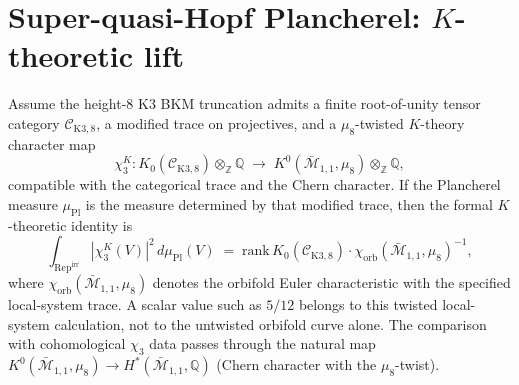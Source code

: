 \section{Super-quasi-Hopf Plancherel: $K$-theoretic lift}
\label{sec:super-quasi-hopf-K-theoretic}

\begin{theorem}
\label{thm:super-quasi-hopf-plancherel-K-theoretic}
%
%
Assume the height-$8$ K3 BKM truncation admits a finite
root-of-unity tensor category
$\mathcal C_{\mathrm{K3},8}$, a modified trace on projectives, and a
$\mu_8$-twisted $K$-theory character map
\begin{equation}\label{eq:super-qh-K-plancherel}
 \chi_3^K\colon
 K_0(\mathcal C_{\mathrm{K3},8})
 \otimes_{\mathbb Z}\mathbb Q\;
 \longrightarrow\;
 K^0(\bar{\mathcal M}_{1,1}, \mu_8)\otimes_{\mathbb Z}\mathbb Q,
\end{equation}
compatible with the categorical trace and the Chern character. If the
Plancherel measure $\mu_{\mathrm{Pl}}$ is the measure determined by
that modified trace, then the formal $K$-theoretic identity is
\begin{equation}\label{eq:super-qh-plancherel-identity}
 \int_{\mathrm{Rep}^{\mathrm{irr}}}
 |\chi_3^K(V)|^2\,d\mu_{\mathrm{Pl}}(V)
 \;=\;
 \mathrm{rank}\,K_0(\mathcal C_{\mathrm{K3},8})
 \cdot \chi_{\mathrm{orb}}(\bar{\mathcal M}_{1,1}, \mu_8)^{-1},
\end{equation}
where $\chi_{\mathrm{orb}}(\bar{\mathcal M}_{1,1},\mu_8)$ denotes the
orbifold Euler characteristic with the specified local-system trace.
A scalar value such as $5/12$ belongs to this twisted local-system
calculation, not to the untwisted orbifold curve alone. The comparison
with cohomological $\chi_3$ data passes through the natural map
$K^0(\bar{\mathcal M}_{1,1}, \mu_8)\to
H^*(\bar{\mathcal M}_{1,1}, \mathbb Q)$
(Chern character with the $\mu_8$-twist).
\end{theorem}

